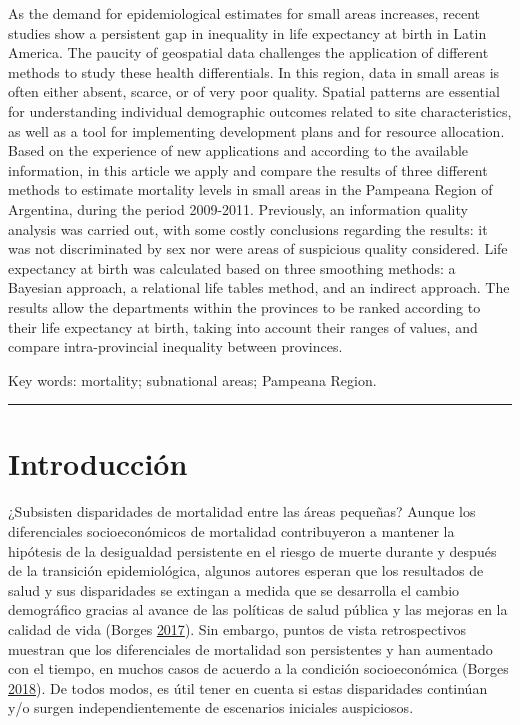 \documentclass[12pt,spanish,]{article}
\begin{document}
As the demand for epidemiological estimates for small areas increases,
recent studies show a persistent gap in inequality in life expectancy at
birth in Latin America. The paucity of geospatial data challenges the
application of different methods to study these health differentials. In
this region, data in small areas is often either absent, scarce, or of
very poor quality. Spatial patterns are essential for understanding
individual demographic outcomes related to site characteristics, as well
as a tool for implementing development plans and for resource
allocation. Based on the experience of new applications and according to
the available information, in this article we apply and compare the
results of three different methods to estimate mortality levels in small
areas in the Pampeana Region of Argentina, during the period 2009-2011.
Previously, an information quality analysis was carried out, with some
costly conclusions regarding the results: it was not discriminated by
sex nor were areas of suspicious quality considered. Life expectancy at
birth was calculated based on three smoothing methods: a Bayesian
approach, a relational life tables method, and an indirect approach. The
results allow the departments within the provinces to be ranked
according to their life expectancy at birth, taking into account their
ranges of values, and compare intra-provincial inequality between
provinces.

Key words: mortality; subnational areas; Pampeana Region.

\begin{center}\rule{0.5\linewidth}{0.5pt}\end{center}

\hypertarget{introducciuxf3n}{%
\section{Introducción}\label{introducciuxf3n}}

¿Subsisten disparidades de mortalidad entre las áreas pequeñas? Aunque
los diferenciales socioeconómicos de mortalidad contribuyeron a mantener
la hipótesis de la desigualdad persistente en el riesgo de muerte
durante y después de la transición epidemiológica, algunos autores
esperan que los resultados de salud y sus disparidades se extingan a
medida que se desarrolla el cambio demográfico gracias al avance de las
políticas de salud pública y las mejoras en la calidad de vida (Borges
\protect\hyperlink{ref-Borges2017}{2017}). Sin embargo, puntos de vista
retrospectivos muestran que los diferenciales de mortalidad son
persistentes y han aumentado con el tiempo, en muchos casos de acuerdo a
la condición socioeconómica (Borges
\protect\hyperlink{ref-Borges2018}{2018}). De todos modos, es útil tener
en cuenta si estas disparidades continúan y/o surgen independientemente
de escenarios iniciales auspiciosos.
\end{document}
